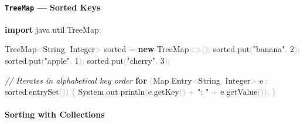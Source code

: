 \documentclass[
  justified,
  openright,
]{tufte-book}
\let\subsection\paragraph
\let\paragraph\paragraph
\newcommand{\KeywordTok}[1]{\textcolor{CodeKeyword}{\textbf{#1}}}  %
\newcommand{\StringTok}[1]{\textcolor{CodeString}{#1}}              %
\newcommand{\CommentTok}[1]{\textcolor{CodeComment}{\textit{#1}}}  %
\newcommand{\CodeNumTok}[1]{\textcolor{CodeNumber}{#1}}             %
\newcommand{\CodeFuncTok}[1]{\textcolor{CodeKeyword}{#1}}           %
\newcommand{\CodeAccentTok}[1]{\textcolor{CodeAccent}{#1}}          %
\newcommand{\OperatorTok}[1]{\textcolor{DarkGray}{#1}}              %
\newenvironment{Shaded}{%
  \begin{mdframed}[style=TufteCode]%
}{%
  \end{mdframed}%
}
\let\subsection\paragraph
\let\paragraph\paragraph
\begin{document}
\subsection{\texorpdfstring{\texttt{TreeMap} --- Sorted
Keys}{TreeMap --- Sorted Keys}}\label{treemap-sorted-keys}

\begin{Shaded}
\begin{Highlighting}[]
\KeywordTok{import} \CodeAccentTok{java}\OperatorTok{.}\CodeAccentTok{util}\OperatorTok{.}\CodeAccentTok{TreeMap}\OperatorTok{;}
 
TreeMap\OperatorTok{\textless{}}String\OperatorTok{,} Integer\OperatorTok{\textgreater{}} sorted \OperatorTok{=} \KeywordTok{new} TreeMap\OperatorTok{\textless{}\textgreater{}();}
sorted\OperatorTok{.}\CodeFuncTok{put}\OperatorTok{(}\StringTok{"banana"}\OperatorTok{,} \CodeNumTok{2}\OperatorTok{);}
sorted\OperatorTok{.}\CodeFuncTok{put}\OperatorTok{(}\StringTok{"apple"}\OperatorTok{,} \CodeNumTok{1}\OperatorTok{);}
sorted\OperatorTok{.}\CodeFuncTok{put}\OperatorTok{(}\StringTok{"cherry"}\OperatorTok{,} \CodeNumTok{3}\OperatorTok{);}
 
\CommentTok{// Iterates in alphabetical key order}
\KeywordTok{for} \OperatorTok{(}Map\OperatorTok{.}\CodeFuncTok{Entry}\OperatorTok{\textless{}}String\OperatorTok{,} Integer\OperatorTok{\textgreater{}} e \OperatorTok{:} sorted\OperatorTok{.}\CodeFuncTok{entrySet}\OperatorTok{())} \OperatorTok{\{}
    System\OperatorTok{.}\CodeFuncTok{out}\OperatorTok{.}\CodeFuncTok{println}\OperatorTok{(}e\OperatorTok{.}\CodeFuncTok{getKey}\OperatorTok{()} \OperatorTok{+} \StringTok{": "} \OperatorTok{+} e\OperatorTok{.}\CodeFuncTok{getValue}\OperatorTok{());}
\OperatorTok{\}}
\end{Highlighting}
\end{Shaded}

\subsection{Sorting with Collections}\label{sorting-with-collections}
\end{document}

